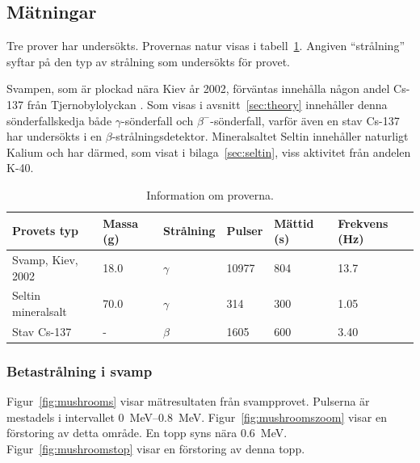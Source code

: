 \subsection{Mätningar}

Tre prover har undersökts. Provernas natur visas i tabell~\ref{tab:samples}.
Angiven ``strålning'' syftar på den typ av strålning som undersökts för provet.

Svampen, som är plockad nära Kiev år 2002, förväntas innehålla någon andel
Cs-137 från Tjernobylolyckan \parencite{instructions}. Som visas i
avsnitt~\ref{sec:theory} innehåller denna sönderfallskedja både
$\gamma$-sönderfall och $\beta^-$-sönderfall, varför även en stav Cs-137
har undersökts i en $\beta$-strålningsdetektor. Mineralsaltet Seltin innehåller
naturligt Kalium och har därmed, som visat i bilaga~\ref{sec:seltin}, viss
aktivitet från andelen K-40. 

\begin{table}[htp]
    \begin{tabular}{|l|l|l|l|l|l|}
    \hline
    Provets typ        & Massa (\unit{g}) & Strålning & Pulser      & Mättid (\unit{s}) & Frekvens (\unit{\Hz}) \\
    \hline
    Svamp, Kiev, 2002  & \num{18.0}       & $\gamma$  & \num{10977} & \num{804}         & \num{13.7}            \\
    \hline
    Seltin mineralsalt & \num{70.0}       & $\gamma$  & \num{314}   & \num{300}         & \num{1.05}            \\
    \hline
    Stav Cs-137        & -                & $\beta$   & \num{1605}  & \num{600}         & \num{3.40}            \\
    \hline
    \end{tabular}
    \caption{Information om proverna.}
    \label{tab:samples}
\end{table}

\subsubsection{Betastrålning i svamp}

Figur~\ref{fig:mushrooms} visar mätresultaten från svampprovet. Pulserna är
mestadels i intervallet \qtyrange{0}{0.8}{\MeV}. Figur~\ref{fig:mushroomszoom}
visar en förstoring av detta område. En topp syns nära \qty{0.6}{\MeV}.
Figur~\ref{fig:mushroomstop} visar en förstoring av denna topp.

